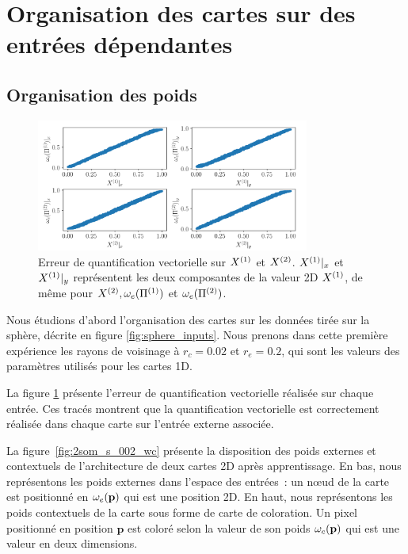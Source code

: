 \documentclass[../main]{subfiles}
\begin{document}
\section{Organisation des cartes sur des entrées dépendantes \label{par:orga2D}}

\subsection{Organisation des poids}

\begin{figure}[h]
	\centering\includegraphics[width=0.8\textwidth]{error-2SOM.png}
	\caption{Erreur de quantification vectorielle sur $X^{({1})}$ et $X^{({2})}$. $X^{({1})}|_x$ et $X^{({1})}|_y$ représentent les deux composantes de la valeur 2D $X^{({1})}$, de même pour $X^{({2})}, \omega_e(\Pi^{({1})})$ et  $\omega_e(\Pi^{({2})})$. \label{fig:err_2D}}
\end{figure}

Nous étudions d'abord l'organisation des cartes sur les données tirée sur la sphère, décrite en figure \ref{fig:sphere_inputs}. 
Nous prenons dans cette première expérience les rayons de voisinage à $r_c = 0.02$ et $r_e = 0.2$, qui sont les valeurs des paramètres utilisés pour les cartes 1D.

La figure \ref{fig:err_2D} présente l'erreur de quantification vectorielle réalisée sur chaque entrée. Ces tracés montrent que la quantification vectorielle est correctement réalisée dans chaque carte sur l'entrée externe associée.

La figure~\ref{fig:2som_s_002_wc} présente la disposition des poids externes et contextuels de l'architecture de deux cartes 2D après apprentissage.
En bas, nous représentons les poids externes dans l'espace des entrées~: un n\oe{}ud de la carte est positionné en $\omega_e(\mathbf{p})$ qui est une position 2D.
En haut, nous représentons les poids contextuels de la carte sous forme de carte de coloration. Un pixel positionné en position $\mathbf{p}$ est coloré selon la valeur de son poids $\omega_c(\mathbf{p})$ qui est une valeur en deux dimensions.
\end{document}
